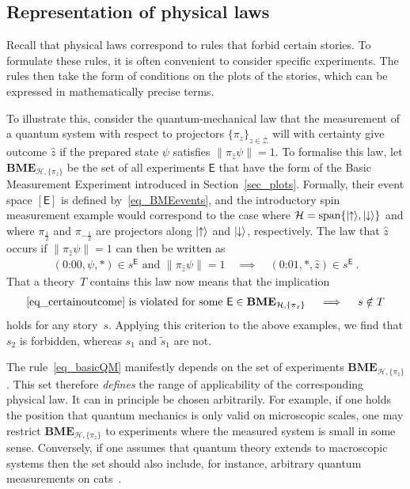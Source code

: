 \documentclass{article}
\theoremstyle{plain}
\theoremstyle{definition}
\newcommand*{\cH}{\mathcal{H}}
\newcommand*{\cZ}{\mathcal{Z}}
\newcommand*{\ket}[1]{{| #1 \rangle}}
\newcommand*{\Exp}{\mathsf{E}}
\newcommand*{\BME}{\mathbf{BME}}
\newcommand*{\spinup}{\ket{{\hspace{-0.1ex}\uparrow\hspace{-0.1ex}}}}
\newcommand*{\spindown}{\ket{{\hspace{-0.1ex}\downarrow\hspace{-0.1ex}}}}
\begin{document}
\subsection{Representation of physical laws}

Recall that physical laws correspond to rules that forbid certain stories.  To formulate these rules, it is often convenient to consider  specific experiments. The rules then take the form of conditions on the plots of the stories, which can be expressed in mathematically precise terms.  

To illustrate this, consider the quantum-mechanical law that the measurement of a quantum system with respect to projectors $\{\pi_{z}\}_{z \in \cZ}$ will with certainty give outcome $\hat{z}$ if the prepared state $\psi$ satisfies $\|\pi_{\hat{z}} \psi \| = 1$.  To formalise this law, let  $\BME_{\cH, \{\pi_z\}}$ be the set of all experiments $\Exp$ that have the form of the Basic Measurement Experiment introduced in Section~\ref{sec_plots}. Formally, their event space $[\Exp]$ is defined by~\eqref{eq_BMEevents}, and the introductory spin measurement example would correspond to the case where $\cH = \mathrm{span}\{\spinup, \spindown\}$ and  where $\pi_{\frac{1}{2}}$ and $\pi_{-\frac{1}{2}}$ are projectors along $\spinup$ and $\spindown$, respectively. The law that $\hat{z}$ occurs if $\|\pi_{\hat{z}} \psi \| = 1$ can then be written as 
\begin{align} \label{eq_certainoutcome}
   (\text{0:00}, \psi, *) \in s^{\Exp}  \text{ and } \|\pi_{\hat{z}} \psi \| = 1 \quad \implies \quad   (\text{0:01}, *, \hat{z}) \in s^{\Exp} \ .
\end{align}
That a theory~$T$ contains this law now means that the implication
\begin{align} \label{eq_basicQM}
  \text{\eqref{eq_certainoutcome} is violated for some $\Exp \in \BME_{\cH, \{\pi_z\}}$}  \quad \implies \quad s \notin T
  \end{align}
  holds for any story~$s$. Applying this criterion to the above examples, we find that $s_2$ is forbidden, whereas $s_1$ and $\tilde{s}_1$ are not.  

The rule~\eqref{eq_basicQM} manifestly depends on the set of experiments $\BME_{\cH, \{\pi_z\}}$. This set therefore \emph{defines} the range of applicability of the corresponding physical law. It can in principle be chosen arbitrarily.  For example, if one holds the position that quantum mechanics is only valid  on microscopic scales, one may restrict $\BME_{\cH, \{\pi_z\}}$ to experiments where the measured system is small in some sense. Conversely, if one assumes that quantum theory extends to macroscopic systems then the set should also include, for instance, arbitrary quantum measurements on cats~\cite{Schroedinger35}.
\end{document}
